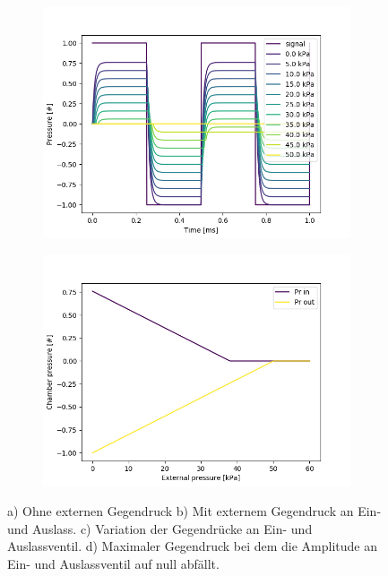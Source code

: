 \documentclass[fontsize=12pt, a4paper]{scrartcl}
\begin{document}
\begin{figure}[H]
\begin{subfigure}[H]{0.48\textwidth}
        \includegraphics[width=\textwidth, valign=t]{bilder/backpressure/backpressure_at_pr_in_and_pr_out.png}
        \label{fig:gegendruck_sweep_double}
    \end{subfigure}
    \begin{subfigure}[H]{0.48\textwidth}
        \includegraphics[width=\textwidth, valign=t]{bilder/backpressure/backpressure_result.png}
        \label{fig:gegendruck_result}
    \end{subfigure}
    \caption{a) Ohne externen Gegendruck b) Mit externem Gegendruck an Ein- und Auslass. c) Variation der Gegendrücke an Ein- und Auslassventil. d) Maximaler Gegendruck bei dem die Amplitude an Ein- und Auslassventil auf null abfällt.}
\end{figure}
\end{document}
